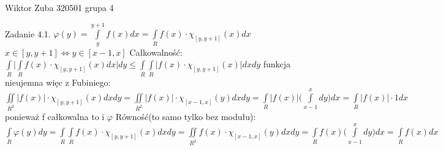 \documentclass{article}
\begin{document}
Wiktor Zuba 320501 grupa 4
\newline

Zadanie 4.1.
\newline
\newline
$
\varphi(y)=\int\limits_{y}^{y+1}f(x)dx
=
\int\limits_{R}f(x)\cdot\chi_{[y,y+1]}(x)dx
$
$
x\in [y,y+1]\Leftrightarrow y\in [x-1,x]
$\newline
Całkowalność:
$
\int\limits_{R}\bigl|\int\limits_{R}f(x)\cdot\chi_{[y,y+1]}(x)dx\bigr|dy
\le
\int\limits_{R}\int\limits_{R}\bigl|f(x)\cdot\chi_{[y,y+1]}(x)\bigr|dxdy
$\newline
funkcja nieujemna więc z Fubiniego:
$
\iint\limits_{R^2}\bigl|f(x)\bigr|\cdot\chi_{[y,y+1]}(x)dxdy
=
\iint\limits_{R^2}\bigl|f(x)\bigr|\cdot\chi_{[x-1,x]}(y)dxdy
=
\int\limits_{R}\bigl|f(x)\bigr|\bigl(\int\limits_{x-1}^{x}dy\bigr)dx
=
\int\limits_{R}\bigl|f(x)\bigr|\cdot 1dx
$ ponieważ f całkowalna to i $\varphi$\newline
Równość(to samo tylko bez modułu):
$
\int\limits_{R}\varphi(y)dy
=
\int\limits_{R}\int\limits_{R}f(x)\cdot\chi_{[y,y+1]}(x)dxdy
=
\iint\limits_{R^2}f(x)\cdot\chi_{[x-1,x]}(y)dxdy
=
\int\limits_{R}f(x)\bigl(\int\limits_{x-1}^{x}dy\bigr)dx
=
\int\limits_{R}f(x)dx
$
\newline
\newline
\end{document}
